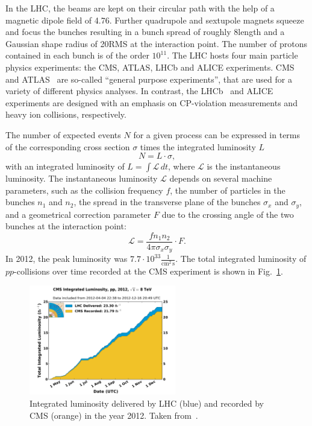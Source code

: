 In the LHC, the beams are kept on their circular path with the help of a magnetic dipole field of 4.76\tesla.
Further quadrupole and sextupole magnets squeeze and focus the bunches resulting in a bunch spread of roughly 8\cm length and a Gaussian shape radius of 20\mum RMS at the interaction point.
The number of protons contained in each bunch is of the order $10^{11}$.
The LHC hosts four main particle physics experiments: the CMS, ATLAS, LHCb and ALICE experiments.
CMS~\cite{bib:CMS:experiment,bib:CMS:TDR} and ATLAS~\cite{bib:ATLAS:experiment,bib:ATLAS:TDR_1,bib:ATLAS:TDR_2} are so-called ``general purpose experiments'', that are used for a variety of different physics analyses.
In contrast, the LHCb~\cite{bib:LHCb:experiment} and ALICE~\cite{bib:ALICE:experiment} experiments are designed with an emphasis on CP-violation measurements and heavy ion collisions, respectively.

The number of expected events $N$ for a given process can be expressed in terms of the corresponding cross section $\sigma$ times the integrated luminosity $L$
\begin{equation}
N = L \cdot \sigma,
\end{equation}
with an integrated luminosity of $L=\int \mathcal{L}\, dt$, where $\mathcal{L}$ is the instantaneous luminosity.
The instantaneous luminosity $\mathcal{L}$ depends on several machine parameters, such as the collision frequency $f$, the number of particles in the bunches $n_1$ and $n_2$,
the spread in the transverse plane of the bunches $\sigma_x$ and $\sigma_y$, and a geometrical correction parameter $F$ due to the crossing angle of the two bunches at the interaction point:
\begin{equation}
\mathcal{L} = \frac{f n_1 n_2 }{4 \pi \sigma_x \sigma_y} \cdot F.
\end{equation}
In 2012, the peak luminosity was $7.7 \cdot 10^{33} \frac{1}{\text{cm}^2\,\text{s}}$.
The total integrated luminosity of $pp$-collisions over time recorded at the CMS experiment is shown in Fig.~\ref{fig:Lumi}.
\begin{figure}[!b]
  \centering
      \includegraphics[width=0.57\textwidth]{figures/experiment/LHC/int_lumi_per_day_cumulative_pp_2012.pdf}
  \caption{Integrated luminosity delivered by LHC (blue) and recorded by CMS (orange) in the year 2012. Taken from~\cite{bib:LumiWiki}.}  
  \label{fig:Lumi}
\end{figure}

